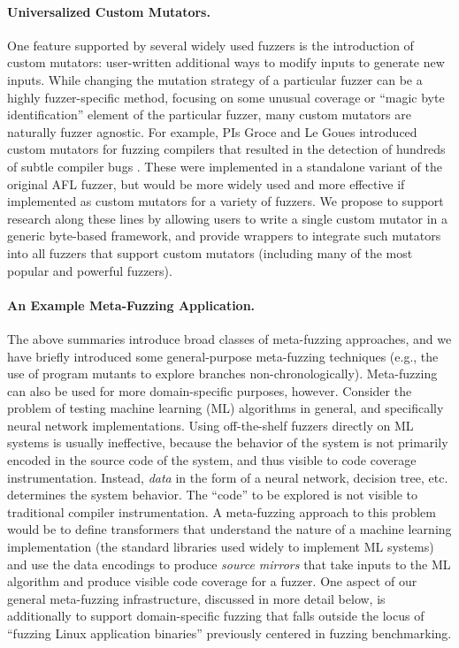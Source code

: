 \paragraph{Universalized Custom Mutators.}  One feature supported by several 
widely used fuzzers is the introduction of custom mutators:  user-written 
additional ways to modify inputs to generate new inputs.  While changing the 
mutation strategy of a particular fuzzer can be a highly fuzzer-specific 
method, focusing on some unusual coverage or ``magic byte identification'' 
element of the particular fuzzer, many custom mutators are naturally fuzzer 
agnostic.  For example, PIs Groce and Le Goues introduced custom mutators for 
fuzzing compilers that resulted in the detection of hundreds of subtle compiler 
bugs \cite{CC22}.  These were implemented in a standalone variant of the 
original AFL fuzzer, but would be more widely used and more effective if 
implemented as custom mutators for a variety of fuzzers.  We propose to support 
research along these lines by allowing users to write a single custom mutator 
in a generic byte-based framework, and provide wrappers to integrate such 
mutators into all fuzzers that support custom mutators (including many of the 
most popular and powerful fuzzers).
   
\paragraph{An Example Meta-Fuzzing Application.} The above summaries introduce 
broad classes of meta-fuzzing approaches, and we have briefly introduced some 
general-purpose meta-fuzzing techniques (e.g., the use of program mutants to 
explore branches non-chronologically).  Meta-fuzzing can also be used for more 
domain-specific purposes, however.  Consider the problem of testing machine 
learning (ML) algorithms in general, and specifically neural network 
implementations.  Using off-the-shelf fuzzers directly on ML systems is usually 
ineffective, because the behavior of the system is not primarily encoded in the 
source code of the system, and thus visible to code coverage instrumentation.  
Instead, \emph{data} in the form of a neural network, decision tree, etc. 
determines the system behavior.  The ``code'' to be explored is not visible to 
traditional compiler instrumentation.  A meta-fuzzing approach to this problem 
would be to define transformers that understand the nature of a machine 
learning implementation (the standard libraries used widely to implement ML 
systems) and use the data encodings to produce \emph{source mirrors} that take 
inputs to the ML algorithm and produce visible code coverage for a fuzzer.  One 
aspect of our general meta-fuzzing infrastructure, discussed in more detail 
below, is additionally to support domain-specific fuzzing that falls outside 
the locus of ``fuzzing Linux application binaries'' previously centered in 
fuzzing benchmarking.


